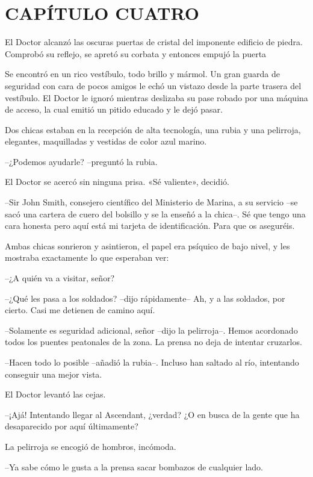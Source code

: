 \chapter*{CAPÍTULO CUATRO}

{El Doctor alcanzó las oscuras puertas de cristal del imponente edificio
 de piedra. Comprobó su reflejo, se apretó su corbata y entonces empujó
la puerta}

{Se encontró en un rico vestíbulo, todo brillo y mármol. Un gran guarda
 de seguridad con cara de pocos amigos le echó un vistazo desde la parte
 trasera del vestíbulo. El Doctor le ignoró mientras deslizaba su pase
 robado por una máquina de acceso, la cual emitió un pitido educado y le
dejó pasar.}

{Dos chicas estaban en la recepción de alta tecnología, una rubia y una
pelirroja, elegantes, maquilladas y vestidas de color azul marino.}

{--¿Podemos ayudarle? --preguntó la rubia.}

{El Doctor se acercó sin ninguna prisa. «Sé valiente», decidió.}

{--Sir John Smith, consejero científico del Ministerio de Marina, a su
 servicio --se sacó una cartera de cuero del bolsillo y se la enseñó a la
 chica--. Sé que tengo una cara honesta pero aquí está mi tarjeta de
identificación. Para que os aseguréis.}

{Ambas chicas sonrieron y asintieron, el papel era psíquico de bajo
nivel, y les mostraba exactamente lo que esperaban ver:}

{--¿A quién va a visitar, señor?}

{--¿Qué les pasa a los soldados? --dijo rápidamente-- Ah, y a las
soldados, por cierto. Casi me detienen de camino aquí.}

{--Solamente es seguridad adicional, señor --dijo la pelirroja--. Hemos
 acordonado todos los puentes peatonales de la zona. La prensa no deja de
intentar cruzarlos.}

{--Hacen todo lo posible --añadió la rubia--. Incluso han saltado al
río, intentando conseguir una mejor vista.}

{El Doctor levantó las cejas.}

{--¡Ajá! Intentando llegar al Ascendant, ¿verdad? ¿O en busca de la
gente que ha desaparecido por aquí últimamente?}

{La pelirroja se encogió de hombros, incómoda.}

{--Ya sabe cómo le gusta a la prensa sacar bombazos de cualquier lado.}

